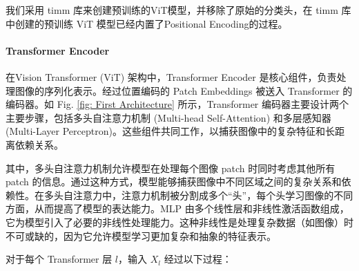 \documentclass[a4paper, 10pt]{article}
\begin{document}
		我们采用 timm 库来创建预训练的ViT模型，并移除了原始的分类头，在 timm 库中创建的预训练 ViT 模型已经内置了Positional Encoding的过程。
		
		\paragraph{Transformer Encoder}
		
		在Vision Transformer (ViT) 架构中，Transformer Encoder 是核心组件，负责处理图像的序列化表示。经过位置编码的 Patch Embeddings 被送入 Transformer 的编码器。如 Fig. \ref{fig: First Architecture} 所示，Transformer 编码器主要设计两个主要步骤，包括多头自注意力机制 (Multi-head Self-Attention) 和多层感知器 (Multi-Layer Perceptron)。这些组件共同工作，以捕获图像中的复杂特征和长距离依赖关系。
		
		其中，多头自注意力机制允许模型在处理每个图像 patch 时同时考虑其他所有 patch 的信息。通过这种方式，模型能够捕获图像中不同区域之间的复杂关系和依赖性。在多头自注意力中，注意力机制被分割成多个“头”，每个头学习图像的不同方面，从而提高了模型的表达能力。MLP 由多个线性层和非线性激活函数组成，它为模型引入了必要的非线性处理能力。这种非线性是处理复杂数据（如图像）时不可或缺的，因为它允许模型学习更加复杂和抽象的特征表示。
		
		对于每个 Transformer 层 $l$，输入 $X_l$ 经过以下过程：
		
\end{document}
